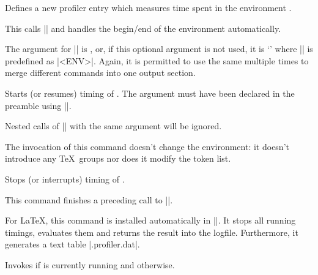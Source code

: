 \begin{command}{\pgfprofilenewforenvironment{}}
	Defines a new profiler entry which measures time spent in the environment . 

	This calls |\pgfprofilenew| and handles the begin/end of the environment automatically.
	
	The argument for |\pgfprofilenew| is , or, if this optional argument is not used, it is `\declareandlabel{\pgfprofileenv}' where |\pgfprofileenv| is predefined as |<ENV>|. Again, it is permitted to use the same  multiple times to merge different commands into one output section.

\end{command}


\begin{command}{\pgfprofilestart{}}
	Starts (or resumes) timing of . The argument must have been declared in the preamble using |\pgfprofilenew|.

	Nested calls of |\pgfprofilestart| with the same argument will be ignored.

	The invocation of this command doesn't change the environment: it doesn't introduce any \TeX\ groups nor does it modify the token list.
\end{command}

\begin{command}{\pgfprofileend{}}
	Stops (or interrupts) timing of . 
	
	This command finishes a preceding call to |\pgfprofilestart|.
\end{command}

\begin{command}{\pgfprofilepostprocess}
	For \LaTeX, this command is installed automatically in ||. It stops all running timings, evaluates them and returns the result into the logfile. Furthermore, it generates a text table |\jobname.profiler.dat|.
\end{command}

\begin{command}{\pgfprofileifisrunning{}}
	Invokes  if  is currently running and  otherwise.
\end{command}
